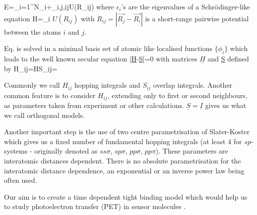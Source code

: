 \be
E=\sum_{i=1}^{N}\epsilon_i+\sum_{i,j,i\neq j}U(R_{ij})
\ee
where $\epsilon_i$'s are the eigenvalues of a Schr{\"o}dinger-like equation
\be
\label{eigenschro}
H=\epsilon_i
\ee
$U(R_{ij})$ with $R_{ij}=|\vec{R_j}-\vec{R_i}|$ is a short-range pairwise
potential between the atoms $i$ and $j$.
\par{Eq.  is solved in a minimal basis set of atomic like
localised functions $\{\phi_i\}$ which leads to the well known secular equation}
\be
|\underline{H}-\epsilon \underline{S}|=0
\ee
with matrices $\underline{H}$ and {\underline{S}} defined by
\be
H_{ij}=H\quad\quad S_{ij}=
\ee
\par{Commonly we call $H_{ij}$ hopping integrals and $S_{ij}$ overlap
integrals. Another common feature is to consider $H_{ij}$, extending only to
first or second neighbours, as parameters taken from experiment or other
calculations. $\underline{S}=\underline{I}$ gives us what we call orthogonal
models.}
\par{Another important step is the use of two centre parametrisation of
Slater-Koster which gives us a fixed number of fundamental hopping integrals
(at least 4 for $sp$-systems - originally denoted as $ss\sigma$, $sp\sigma$,
$pp\sigma$, $pp\pi$). These parameters are interatomic
distances dependent. There is no absolute parametrisation for the interatomic distance
dependence, an exponential or an inverse power law being often used.}
\par{Our aim is to create a time dependent tight binding model which would help us to study
photoelectron transfer (PET) in sensor molecules \citep{deSilva01b}.}

